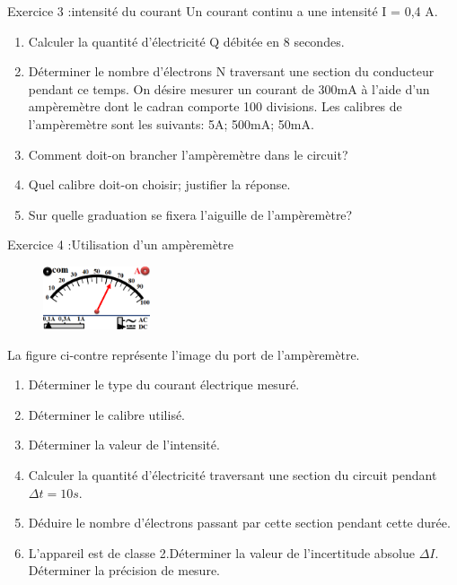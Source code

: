 \documentclass[12pt, french]{article}
\begin{document}
\begin{Box2}{Exercice 3 :intensité du courant  }
Un courant continu a une intensité I = 0,4 A.
\begin{enumerate}
	\item  Calculer la quantité d'électricité Q débitée en 8 secondes.
	\item  Déterminer le nombre d'électrons N traversant une section du conducteur pendant ce temps.
On désire mesurer un courant de 300mA à l'aide d'un ampèremètre dont le cadran comporte 100
divisions. Les calibres de l'ampèremètre sont les suivants: 5A; 500mA; 50mA.
\item  Comment doit-on brancher l'ampèremètre dans le circuit?
\item  Quel calibre doit-on choisir; justifier la réponse.
\item Sur quelle graduation se fixera l'aiguille de l'ampèremètre?
\end{enumerate}
\end{Box2}





\begin{Box2}{Exercice 4 :Utilisation d'un ampèremètre }

	\begin{figure}
		\vspace{-0.5cm}
  \begin{center}
	\includegraphics[width=0.28\textwidth]{./img/ex04.png}
  \end{center}
\end{figure}
La figure ci-contre représente l'image du port de l'ampèremètre.
\begin{enumerate}
	\item   Déterminer le type du courant électrique mesuré.
	\item  Déterminer le calibre utilisé.
	\item  Déterminer la valeur de l'intensité.
	\item  Calculer la quantité d'électricité traversant une section du
		circuit pendant $\Delta{t} = 10s$.
\item  Déduire le nombre d'électrons passant par cette section
pendant cette durée.
\item L'appareil est de classe 2.Déterminer la valeur de l’incertitude absolue $\Delta{I}$. Déterminer la précision de mesure.

\end{enumerate}
\end{Box2}
\end{document}
